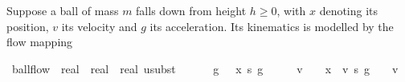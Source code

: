 \documentclass[envcountsame,envcountsect]{llncs}
\begin{document}
\begin{example}\label{ex:ball-hoare}
  Suppose a ball of mass $m$ falls down from height $h\geq 0$, with
  $x$ denoting its position, $v$ its velocity and $g$ its
  acceleration. Its kinematics is modelled by the flow mapping
\begin{isabellebody}
\isanewline
{}\isamarkupfalse%
\ ball{\isacharunderscore}flow\ {\isacharcolon}{\isacharcolon}\ {\isachardoublequoteopen}real\ {\isasymRightarrow}\ real\ {\isasymRightarrow}\ {\isacharparenleft}real{\isacharcircum}{}{\isacharparenright}\ usubst{\isachardoublequoteclose}\ {\isacharparenleft}{\isachardoublequoteopen}{\isasymphi}{\isachardoublequoteclose}{\isacharparenright}\ \isanewline
\ \ \ {\isachardoublequoteopen}{\isasymphi}\ g\ {\isasymtau}\ {\isasymequiv}\ {\isacharbrackleft}x\ {\isasymmapsto}\isactrlsub s\ g\ {\isasymcdot}\ {\isasymtau}\ {\isacharcircum}\ {}{\isacharslash}{}\ {\isacharplus}\ v\ {\isasymcdot}\ {\isasymtau}\ {\isacharplus}\ x{\isacharcomma}\ \ v\ {\isasymmapsto}\isactrlsub s\ g\ {\isasymcdot}\ {\isasymtau}\ {\isacharplus}\ v{\isacharbrackright}{\isachardoublequoteclose}\isanewline
\end{isabellebody}


\end{example}
\end{document}
